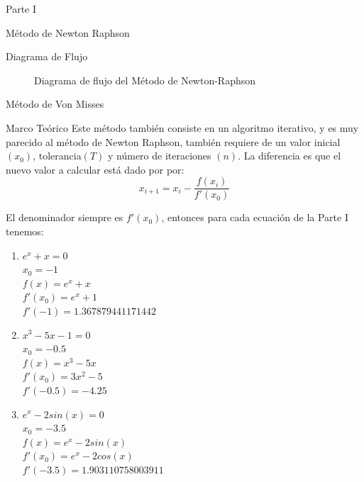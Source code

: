 \documentclass[legalpaper, 12pt]{article}
\def \eqa {\(e^x + x = 0\)}
\def \eqb {\(x^3 - 5x - 1 = 0\)}
\def \eqc {\(e^x - 2sin(x) = 0\)}
\begin{document}
\begin{section}{Parte I}
\begin{subsection}{Método de Newton Raphson}
      \newpage
      \begin{subsubsection}{Diagrama de Flujo}
        \begin{figure}[h]
          \centering
          
          \caption{Diagrama de flujo del Método de Newton-Raphson}
        \end{figure}
      \end{subsubsection}
      \break
    \end{subsection}
    \newpage
    \begin{subsection}{Método de Von Misses}
      \begin{subsubsection}{Marco Teórico}
        Este método también consiste en un algoritmo iterativo, y es muy parecido al método de Newton Raphson, también requiere de un valor inicial $(x_0)$, tolerancia$(T)$ y número de iteraciones $(n)$. La diferencia es que el nuevo valor a calcular está dado por por:
        \[x_{i+1} = x_i - \frac{f(x_i)}{f'(x_0)}\]

        El denominador siempre es $f'(x_0)$, entonces para cada ecuación de la Parte I tenemos:
        \begin{enumerate}
          \item \eqa\\$x_0=-1$\\
          $f(x) = e^x+x$\\
          $f'(x_0) = e^x+1$\\
          $f'(-1) = 1.367879441171442$
          \item \eqb\\$x_0=-0.5$\\
          $f(x) = x^3-5x$\\
          $f'(x_0) = 3x^2-5$\\
          $f'(-0.5) = -4.25$
          \item \eqc\\$x_0=-3.5$\\
          $f(x) = e^x-2sin(x)$\\
          $f'(x_0) = e^x-2cos(x)$\\
          $f'(-3.5) = 1.903110758003911$
        \end{enumerate}


\end{subsubsection}
\end{subsection}
\end{section}
\end{document}
